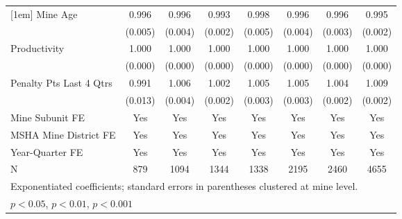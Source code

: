 {\begin{tabular}{l*{7}{c}}
[1em]
Mine Age                 &       0.996         &       0.996         &       0.993\sym{**} &       0.998         &       0.996         &       0.996         &       0.995         \\
                         &     (0.005)         &     (0.004)         &     (0.002)         &     (0.005)         &     (0.004)         &     (0.003)         &     (0.002)         \\
[1em]
Productivity             &       1.000         &       1.000         &       1.000         &       1.000         &       1.000         &       1.000\sym{*}  &       1.000         \\
                         &     (0.000)         &     (0.000)         &     (0.000)         &     (0.000)         &     (0.000)         &     (0.000)         &     (0.000)         \\
[1em]
Penalty Pts Last 4 Qtrs  &       0.991         &       1.006         &       1.002         &       1.005         &       1.005         &       1.004\sym{*}  &       1.009\sym{***}\\
                         &     (0.013)         &     (0.004)         &     (0.002)         &     (0.003)         &     (0.003)         &     (0.002)         &     (0.002)         \\
[1em]
Mine Subunit FE          &         Yes         &         Yes         &         Yes         &         Yes         &         Yes         &         Yes         &         Yes         \\
[1em]
MSHA Mine District FE    &         Yes         &         Yes         &         Yes         &         Yes         &         Yes         &         Yes         &         Yes         \\
[1em]
Year-Quarter FE          &         Yes         &         Yes         &         Yes         &         Yes         &         Yes         &         Yes         &         Yes         \\
\hline
N                        &         879         &        1094         &        1344         &        1338         &        2195         &        2460         &        4655         \\
\hline\hline
\multicolumn{8}{l}{\footnotesize Exponentiated coefficients; standard errors in parentheses clustered at mine level.}\\
\multicolumn{8}{l}{\footnotesize \sym{*} \(p<0.05\), \sym{**} \(p<0.01\), \sym{***} \(p<0.001\)}\\
\end{tabular}
}
